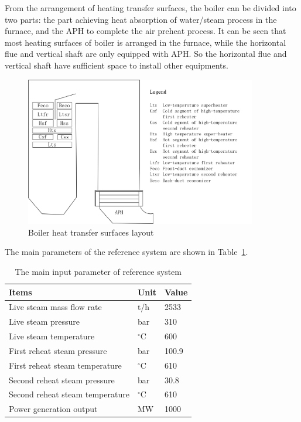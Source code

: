 \documentclass[preprint,12pt]{elsarticle}
\begin{document}
From the arrangement of heating transfer surfaces, the boiler can be divided into two parts: the part achieving heat absorption of water/steam process in the furnace, and the APH to complete the air preheat process.
It can be seen that most heating surfaces of boiler is arranged in the furnace, while the horizontal flue and vertical shaft are only equipped with APH.
So the horizontal flue and vertical shaft have sufficient space to install other equipments.

\begin{figure}[htbp]
\centering
\includegraphics[width=0.9\textwidth]{fig/boiler_surface.png}
\caption{Boiler heat transfer surfaces layout} 
\label{fig:boiler_surface}
\end{figure}


The main parameters of the reference system are shown in Table~\ref{tab:ref input}.

\begin{table}[htbp]
\caption{The main input parameter of reference system }
\label{tab:ref input}
\centering
\begin{tabular}{lll}
\toprule 
Items & Unit & Value\tabularnewline
\midrule
 Live steam mass flow rate 	    	&t/h 			&2533 \\
 Live steam pressure 		    	&bar 			&310\\
 Live steam temperature		     	&$^\circ$C		&600		\\
 First reheat steam pressure    	&bar			&100.9		\\
 First reheat steam temperature  	&$^\circ$C		&610		\\
 Second reheat steam pressure    	&bar			&30.8		\\
 Second reheat steam temperature 	&$^\circ$C		&610		\\
 Power generation output 			&MW				&1000		\\
\bottomrule
\end{tabular}	
\end{table}
\end{document}
